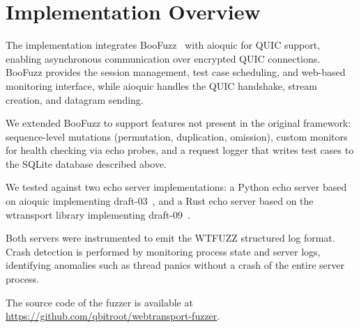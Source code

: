 \section{Implementation Overview}

The implementation integrates BooFuzz~\cite{boofuzz_docs, boofuzz_github} with aioquic for QUIC support, enabling asynchronous communication over encrypted QUIC connections. BooFuzz provides the session management, test case scheduling, and web-based monitoring interface, while aioquic handles the QUIC handshake, stream creation, and datagram sending.

We extended BooFuzz to support features not present in the original framework: sequence-level mutations (permutation, duplication, omission), custom monitors for health checking via echo probes, and a request logger that writes test cases to the SQLite database described above.

We tested against two echo server implementations: a Python echo server based on aioquic implementing draft-03~\cite{w3c_echo_server}, and a Rust echo server based on the wtransport library implementing draft-09~\cite{wtransport_github}.

Both servers were instrumented to emit the WTFUZZ structured log format. Crash detection is performed by monitoring process state and server logs, identifying anomalies such as thread panics without a crash of the entire server process.

The source code of the fuzzer is available at \url{https://github.com/qbitroot/webtransport-fuzzer}.
